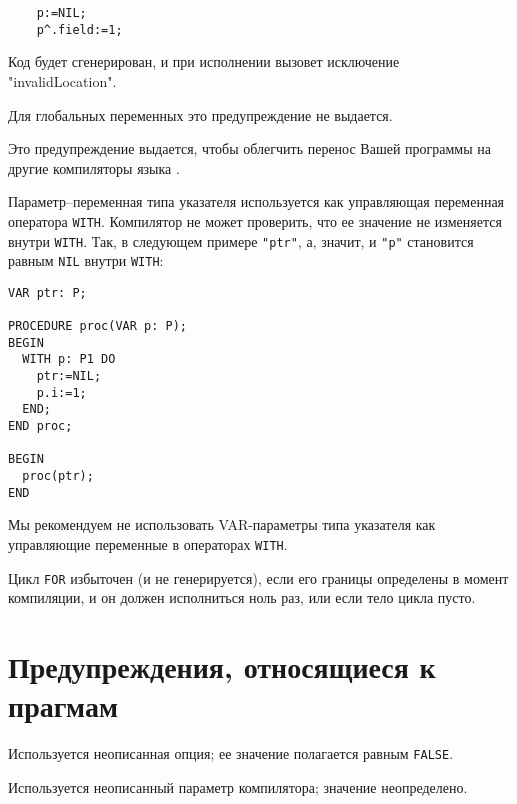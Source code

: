 \verb'    p:=NIL;'\\
\verb'    p^.field:=1;'

Код будет сгенерирован, и при исполнении вызовет исключение
"invalidLocation".

Для глобальных переменных это предупреждение не выдается.


Это предупреждение выдается, чтобы облегчить перенос Вашей
программы на другие компиляторы языка \mt{}.


Параметр--переменная типа указателя используется как управляющая переменная
\ot{} оператора \verb'WITH'.
Компилятор не может проверить, что ее значение не изменяется 
внутри \verb'WITH'. 
Так, в следующем примере \verb'"ptr"', а, значит, и \verb'"p"' 
становится равным \verb'NIL' внутри \verb'WITH':

\begin{verbatim}
VAR ptr: P;

PROCEDURE proc(VAR p: P);
BEGIN
  WITH p: P1 DO
    ptr:=NIL;
    p.i:=1;
  END;
END proc;

BEGIN
  proc(ptr);
END
\end{verbatim}

Мы рекомендуем не использовать VAR-параметры типа указателя
как управляющие переменные в операторах \verb'WITH'.


Цикл \verb'FOR' избыточен (и не генерируется), если его границы
определены в момент компиляции, и он должен исполниться ноль раз,
или если тело цикла пусто.

\section{Предупреждения, относящиеся к прагмам}


Используется неописанная опция; ее значение полагается равным \verb'FALSE'.


Используется неописанный параметр компилятора; значение неопределено.


